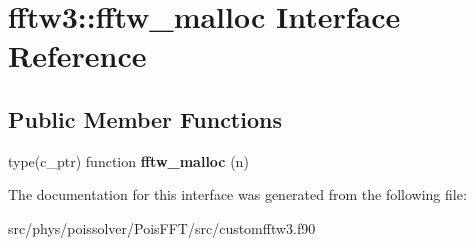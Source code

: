 \hypertarget{interfacefftw3_1_1fftw__malloc}{}\section{fftw3\+:\+:fftw\+\_\+malloc Interface Reference}
\label{interfacefftw3_1_1fftw__malloc}
\subsection*{Public Member Functions}
\begin{DoxyCompactItemize}
\item 
type(c\+\_\+ptr) function {\bfseries fftw\+\_\+malloc} (n)\hypertarget{interfacefftw3_1_1fftw__malloc_a51b4e504b336f0b09c8d826e8cc34e31}{}\label{interfacefftw3_1_1fftw__malloc_a51b4e504b336f0b09c8d826e8cc34e31}

\end{DoxyCompactItemize}


The documentation for this interface was generated from the following file\+:\begin{DoxyCompactItemize}
\item 
src/phys/poissolver/\+Pois\+F\+F\+T/src/customfftw3.\+f90\end{DoxyCompactItemize}
